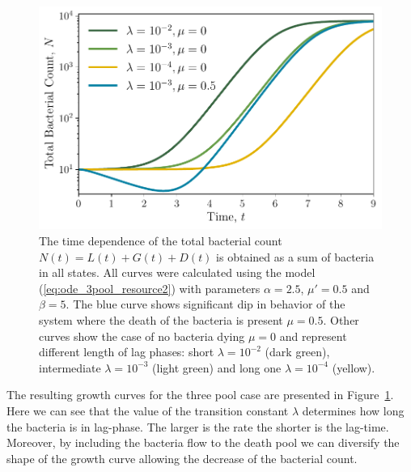 \documentclass[10pt,A4paper]{article}
\numberwithin{equation}{section}
\begin{document}
\begin{figure}[h]
    \begin{center}
    \includegraphics[width=0.9\columnwidth]{Figures/pool_model_3pools_resource.pdf}
    \caption{
        The time dependence of the total bacterial count $N(t) = L(t) + G(t) + D(t)$ is obtained as a sum of bacteria in all states.
        All curves were calculated using the model (\ref{eq:ode_3pool_resource2}) with parameters $\alpha=2.5$, $\mu'=0.5$ and $\beta=5$.
        The blue curve shows significant dip in behavior of the system where the death of the bacteria is present $\mu = 0.5$.
        Other curves show the case of no bacteria dying $\mu=0$ and represent different length of lag phases:
        short $\lambda=10^{-2}$ (dark green), intermediate $\lambda=10^{-3}$ (light green) and long one $\lambda=10^{-4}$ (yellow).
    }
    \label{fig:3pool_resource_plots}
    \end{center}
\end{figure}
The resulting growth curves for the three pool case are presented in Figure~\ref{fig:3pool_resource_plots}.
Here we can see that the value of the transition constant $\lambda$ determines how long the bacteria is in lag-phase.
The larger is the rate the shorter is the lag-time.
Moreover, by including the bacteria flow to the death pool we can diversify the shape of the growth curve allowing the decrease of the bacterial count.
%
%
%
\end{document}
